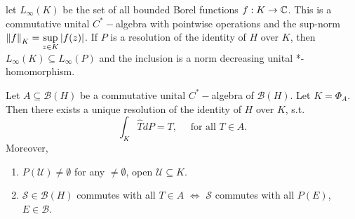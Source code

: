 \documentclass{article}
\begin{document}
\begin{boxdef}\label{def: L_infinity roti}
    let $L_\infty(K)$ be the set of all bounded Borel functions $f:K\to \mathbb{C}$. This is a commutative unital $C^*-$algebra with pointwise operations and the sup-norm $\left\lVert f\right\rVert_K = \displaystyle\sup_{z\in K}|f(z)|$. If $P$ is a resolution of the identity of $H$ over $K$, then $L_\infty(K)\subseteq L_\infty(P)$ and the inclusion is a norm decreasing unital *-homomorphism.
\end{boxdef}

\begin{theorem}\label{thm: spectral theorem C^*}
    Let $A\subseteq\mathcal{B}(H)$ be a commutative unital $C^*-$algebra of $\mathcal{B}(H)$. Let $K = \Phi_A$. Then there exists a unique resolution of the identity of $H$ over $K$, s.t. 
    $$
    \displaystyle\int_K \hat{T}dP=T, \quad \text{ for all }T\in A.
    $$
    Moreover,
    \begin{enumerate}[label = (\roman*), align = left]
        \item $P(\mathcal{U})\neq \emptyset$ for any $\neq \emptyset$, open $\mathcal{U}\subseteq K$.
        \item $\mathcal{S}\in \mathcal{B}(H)$ commutes with all $T\in A$ $\iff$ $\mathcal{S}$ commutes with all $P(E)$, $E\in \mathcal{B}$.
    \end{enumerate}
\end{theorem}
\end{document}
